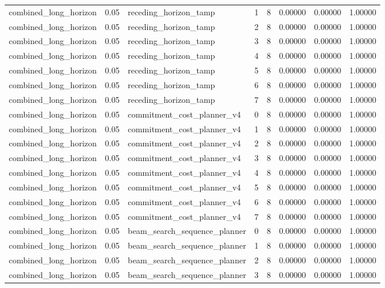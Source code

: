 \documentclass{article}
\begin{document}
\begin{table}[tbp]
{\begin{tabular}{llllllll}
combined\_long\_horizon & 0.05 & receding\_horizon\_tamp & 1 & 8 & 0.00000 & 0.00000 & 1.00000 \\
combined\_long\_horizon & 0.05 & receding\_horizon\_tamp & 2 & 8 & 0.00000 & 0.00000 & 1.00000 \\
combined\_long\_horizon & 0.05 & receding\_horizon\_tamp & 3 & 8 & 0.00000 & 0.00000 & 1.00000 \\
combined\_long\_horizon & 0.05 & receding\_horizon\_tamp & 4 & 8 & 0.00000 & 0.00000 & 1.00000 \\
combined\_long\_horizon & 0.05 & receding\_horizon\_tamp & 5 & 8 & 0.00000 & 0.00000 & 1.00000 \\
combined\_long\_horizon & 0.05 & receding\_horizon\_tamp & 6 & 8 & 0.00000 & 0.00000 & 1.00000 \\
combined\_long\_horizon & 0.05 & receding\_horizon\_tamp & 7 & 8 & 0.00000 & 0.00000 & 1.00000 \\
combined\_long\_horizon & 0.05 & commitment\_cost\_planner\_v4 & 0 & 8 & 0.00000 & 0.00000 & 1.00000 \\
combined\_long\_horizon & 0.05 & commitment\_cost\_planner\_v4 & 1 & 8 & 0.00000 & 0.00000 & 1.00000 \\
combined\_long\_horizon & 0.05 & commitment\_cost\_planner\_v4 & 2 & 8 & 0.00000 & 0.00000 & 1.00000 \\
combined\_long\_horizon & 0.05 & commitment\_cost\_planner\_v4 & 3 & 8 & 0.00000 & 0.00000 & 1.00000 \\
combined\_long\_horizon & 0.05 & commitment\_cost\_planner\_v4 & 4 & 8 & 0.00000 & 0.00000 & 1.00000 \\
combined\_long\_horizon & 0.05 & commitment\_cost\_planner\_v4 & 5 & 8 & 0.00000 & 0.00000 & 1.00000 \\
combined\_long\_horizon & 0.05 & commitment\_cost\_planner\_v4 & 6 & 8 & 0.00000 & 0.00000 & 1.00000 \\
combined\_long\_horizon & 0.05 & commitment\_cost\_planner\_v4 & 7 & 8 & 0.00000 & 0.00000 & 1.00000 \\
combined\_long\_horizon & 0.05 & beam\_search\_sequence\_planner & 0 & 8 & 0.00000 & 0.00000 & 1.00000 \\
combined\_long\_horizon & 0.05 & beam\_search\_sequence\_planner & 1 & 8 & 0.00000 & 0.00000 & 1.00000 \\
combined\_long\_horizon & 0.05 & beam\_search\_sequence\_planner & 2 & 8 & 0.00000 & 0.00000 & 1.00000 \\
combined\_long\_horizon & 0.05 & beam\_search\_sequence\_planner & 3 & 8 & 0.00000 & 0.00000 & 1.00000 \\
\bottomrule
\end{tabular}
}
\end{table}
\end{document}
